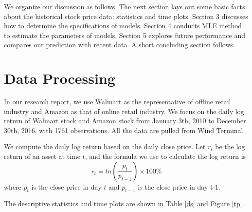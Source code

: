 \documentclass[paper=a4, fontsize=11pt]{article}
\begin{document}
We organize our discussion as follows. The next section lays out some basic facts about the historical stock price data: statistics and time plots. Section 3 discusses how to determine the specifications of models. Section 4 conducts MLE method to estimate the parameters of models. Section 5 explores future performance and compares our prediction with recent data. A short concluding section follows.

\section{Data Processing}
In our research report, we use Walmart as the representative of offline retail industry and Amazon as that of online retail industry. We focus on the daily log return of Walmart stock and Amazon stock from January 3th, 2010 to December 30th, 2016, with 1761 observations. All the data are pulled from Wind Terminal.

We compute the daily log return based on the  daily close price. Let $r_t$ be the log return of an asset at time $t$, and the formula we use to calculate the log return is
\[ r_t = ln(\frac{p_t}{p_{t-1}}) \times 100\% \]
where $p_t$ is the close price in day $t$ and $p_{t-1}$ is the close price in day {t-1}.

The descriptive statistics and time plots are shown in Table \ref{ds} and Figure \ref{tp}.
\end{document}
